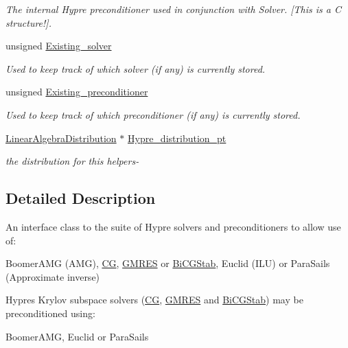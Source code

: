 \begin{DoxyCompactItemize}
\begin{DoxyCompactList}\small\item\em The internal Hypre preconditioner used in conjunction with Solver. \mbox{[}This is a C structure!\mbox{]}. \end{DoxyCompactList}\item 
unsigned \hyperlink{classoomph_1_1HypreInterface_ab81e804ece2fbf658eac9c1f5c1ddc0b}{Existing\+\_\+solver}
\begin{DoxyCompactList}\small\item\em Used to keep track of which solver (if any) is currently stored. \end{DoxyCompactList}\item 
unsigned \hyperlink{classoomph_1_1HypreInterface_afbf32858e2c01d037c7f16de713df49e}{Existing\+\_\+preconditioner}
\begin{DoxyCompactList}\small\item\em Used to keep track of which preconditioner (if any) is currently stored. \end{DoxyCompactList}\item 
\hyperlink{classoomph_1_1LinearAlgebraDistribution}{Linear\+Algebra\+Distribution} $\ast$ \hyperlink{classoomph_1_1HypreInterface_a30dce43f55e1f40d6f5e3ec48130a127}{Hypre\+\_\+distribution\+\_\+pt}
\begin{DoxyCompactList}\small\item\em the distribution for this helpers-\/ \end{DoxyCompactList}\end{DoxyCompactItemize}


\subsection{Detailed Description}
An interface class to the suite of Hypre solvers and preconditioners to allow use of\+:

Boomer\+A\+MG (A\+MG), \hyperlink{classoomph_1_1CG}{CG}, \hyperlink{classoomph_1_1GMRES}{G\+M\+R\+ES} or \hyperlink{classoomph_1_1BiCGStab}{Bi\+C\+G\+Stab}, Euclid (I\+LU) or Para\+Sails (Approximate inverse)

Hypre\textquotesingle{}s Krylov subspace solvers (\hyperlink{classoomph_1_1CG}{CG}, \hyperlink{classoomph_1_1GMRES}{G\+M\+R\+ES} and \hyperlink{classoomph_1_1BiCGStab}{Bi\+C\+G\+Stab}) may be preconditioned using\+: \begin{DoxyVerb}    BoomerAMG, Euclid or ParaSails\end{DoxyVerb}
 

